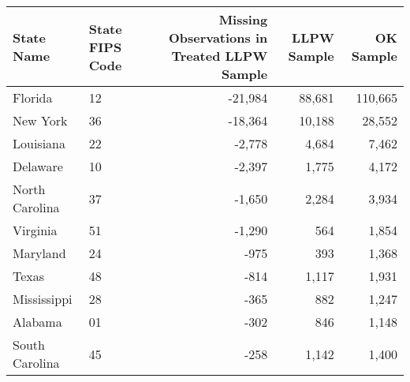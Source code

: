 \begin{tabular}{llrrr}
  \hline
State Name & State FIPS Code & Missing Observations in Treated LLPW Sample & LLPW Sample & OK Sample \\ 
  \hline
Florida & 12 & -21,984 & 88,681 & 110,665 \\ 
  New York & 36 & -18,364 & 10,188 & 28,552 \\ 
  Louisiana & 22 & -2,778 & 4,684 & 7,462 \\ 
  Delaware & 10 & -2,397 & 1,775 & 4,172 \\ 
  North Carolina & 37 & -1,650 & 2,284 & 3,934 \\ 
  Virginia & 51 & -1,290 & 564 & 1,854 \\ 
  Maryland & 24 & -975 & 393 & 1,368 \\ 
  Texas & 48 & -814 & 1,117 & 1,931 \\ 
  Mississippi & 28 & -365 & 882 & 1,247 \\ 
  Alabama & 01 & -302 & 846 & 1,148 \\ 
  South Carolina & 45 & -258 & 1,142 & 1,400 \\ 
   \hline
\end{tabular}

